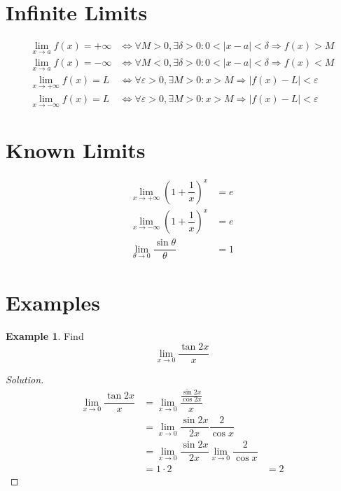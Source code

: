 \documentclass[fleqn]{article}
\theoremstyle{definition}
\newtheorem{example}{Example}
\theoremstyle{theorem}
\theoremstyle{remark}
\newenvironment{solution}
	{\begin{proof}[Solution]\let\qed\relax}
	{\end{proof}}
\begin{document}
\section{Infinite Limits}

\begin{align*}
	\lim\limits_{x \rightarrow a} f(x) = +\infty &\Leftrightarrow \forall M > 0, \exists \delta > 0 : 0 < |x - a| < \delta \Rightarrow f(x) > M\\
	\lim\limits_{x \rightarrow a} f(x) = -\infty &\Leftrightarrow \forall M < 0, \exists \delta > 0 : 0 < |x - a| < \delta \Rightarrow f(x) < M\\
	\lim\limits_{x \rightarrow +\infty} f(x) = L &\Leftrightarrow\forall \varepsilon > 0, \exists M > 0 : x > M \Rightarrow |f(x) - L| < \varepsilon\\
	\lim\limits_{x \rightarrow -\infty} f(x) = L &\Leftrightarrow\forall \varepsilon > 0, \exists M > 0 : x > M \Rightarrow |f(x) - L| < \varepsilon
\end{align*}

\section{Known Limits}

\begin{align*}
	\lim\limits_{x \rightarrow +\infty} \left(1 + \dfrac{1}{x}\right) ^x &= e\\
	\lim\limits_{x \rightarrow -\infty} \left(1 + \dfrac{1}{x}\right) ^x &= e\\
	\lim\limits_{\theta \rightarrow 0} \dfrac{\sin \theta}{\theta} &= 1
\end{align*}

\section{Examples}

\begin{example}
	Find
	\begin{equation*}
		\lim\limits_{x \rightarrow 0} \dfrac{\tan 2x}{x}
	\end{equation*}
\end{example}

\begin{solution}
	\begin{align*}
		\lim\limits_{x \rightarrow 0} \dfrac{\tan 2x}{x} &= \lim\limits_{x \rightarrow 0} \dfrac{\frac{\sin 2x}{\cos 2x}}{x}\\
		&= \lim\limits_{x \rightarrow 0} \dfrac{\sin 2x}{2x} \dfrac{2}{\cos x}\\
		&=\lim\limits_{x \rightarrow 0}  \dfrac{\sin 2x}{2x} \lim\limits_{x \rightarrow 0} \dfrac{2}{\cos x}\\
		&= 1 \cdot 2 
		&= 2
	\end{align*}
\end{solution}
\end{document}
